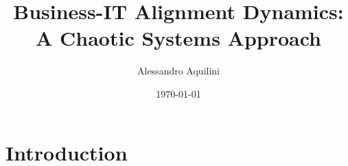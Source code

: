 \documentclass[a4paper, 10pt]{article}
\title{Business-IT Alignment Dynamics: A Chaotic Systems Approach}
\author{Alessandro Aquilini}
\date{\today}
\begin{document}
\raggedright     %

\maketitle


\tableofcontents

\section{Introduction}
%
%
\end{document}
